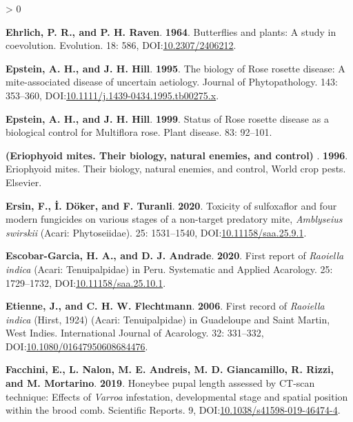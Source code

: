 \documentclass{ufdissertation}[overrideChapters] %
\newlength{\cslhangindent}
\newenvironment{CSLReferences}[2] %
 {%
  \setlength{\parindent}{0pt}
  \ifodd #1 \everypar{\setlength{\hangindent}{\cslhangindent}}\ignorespaces\fi
  \ifnum #2 > 0
  \setlength{\parskip}{#2\baselineskip}
  \fi
 }%
 {}
\begin{document}
{\begin{CSLReferences}{1}{1}
\leavevmode{}%
\textbf{Ehrlich, P. R., and P. H. Raven}. \textbf{1964}. Butterflies and plants: A study in coevolution. Evolution. 18: 586, DOI:\href{https://doi.org/10.2307/2406212}{10.2307/2406212}.

\leavevmode{}%
\textbf{Epstein, A. H., and J. H. Hill}. \textbf{1995}. The biology of {Rose rosette disease}: A mite-associated disease of uncertain aetiology. Journal of Phytopathology. 143: 353--360, DOI:\href{https://doi.org/10.1111/j.1439-0434.1995.tb00275.x}{10.1111/j.1439-0434.1995.tb00275.x}.

\leavevmode{}%
\textbf{Epstein, A. H., and J. H. Hill}. \textbf{1999}. Status of {Rose rosette disease} as a biological control for {Multiflora rose}. Plant disease. 83: 92--101.

\leavevmode{}%
\textbf{(Eriophyoid mites. Their biology, natural enemies, and control) }. \textbf{1996}. Eriophyoid mites. Their biology, natural enemies, and control, World crop pests. Elsevier.

\leavevmode{}%
\textbf{Ersin, F., İ. Döker, and F. Turanli}. \textbf{2020}. Toxicity of sulfoxaflor and four modern fungicides on various stages of a non-target predatory mite, {\emph{Amblyseius swirskii}} ({Acari}: {Phytoseiidae}). 25: 1531--1540, DOI:\href{https://doi.org/10.11158/saa.25.9.1}{10.11158/saa.25.9.1}.

\leavevmode{}%
\textbf{Escobar-Garcia, H. A., and D. J. Andrade}. \textbf{2020}. First report of {\emph{Raoiella indica}} ({Acari}: {Tenuipalpidae}) in {Peru}. Systematic and Applied Acarology. 25: 1729--1732, DOI:\href{https://doi.org/10.11158/saa.25.10.1}{10.11158/saa.25.10.1}.

\leavevmode{}%
\textbf{Etienne, J., and C. H. W. Flechtmann}. \textbf{2006}. First record of {\emph{Raoiella indica}} ({Hirst}, 1924) ({Acari}: {Tenuipalpidae}) in {Guadeloupe} and {Saint Martin}, {West Indies}. International Journal of Acarology. 32: 331--332, DOI:\href{https://doi.org/10.1080/01647950608684476}{10.1080/01647950608684476}.

\leavevmode{}%
\textbf{Facchini, E., L. Nalon, M. E. Andreis, M. D. Giancamillo, R. Rizzi, and M. Mortarino}. \textbf{2019}. Honeybee pupal length assessed by {CT}-scan technique: Effects of {\emph{Varroa}} infestation, developmental stage and spatial position within the brood comb. Scientific Reports. 9, DOI:\href{https://doi.org/10.1038/s41598-019-46474-4}{10.1038/s41598-019-46474-4}.


\end{CSLReferences}}
\end{document}

